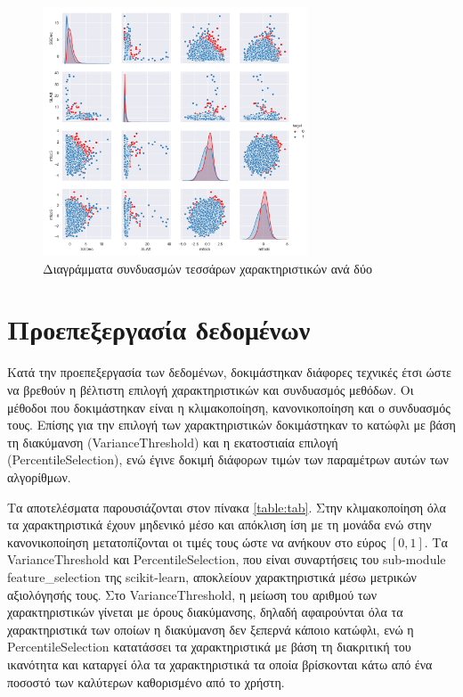 \begin{figure}[h]
\centering
\includegraphics[width=0.7\textwidth]{res/figure_1.png}
\caption{Διαγράμματα συνδυασμών τεσσάρων χαρακτηριστικών ανά δύο}
\label{featureTable:table1}
\end{figure}


\section{Προεπεξεργασία δεδομένων}

Κατά την προεπεξεργασία των δεδομένων, δοκιμάστηκαν διάφορες τεχνικές έτσι ώστε να βρεθούν η βέλτιστη επιλογή χαρακτηριστικών και συνδυασμός μεθόδων. Οι μέθοδοι που δοκιμάστηκαν είναι η κλιμακοποίηση, κανονικοποίηση και ο συνδυασμός τους. Επίσης για την επιλογή των χαρακτηριστικών δοκιμάστηκαν το κατώφλι με βάση τη διακύμανση (VarianceThreshold) και η εκατοστιαία επιλογή (PercentileSelection), ενώ έγινε δοκιμή διάφορων τιμών των παραμέτρων αυτών των αλγορίθμων.

Τα αποτελέσματα παρουσιάζονται στον πίνακα \ref{table:tab}. Στην κλιμακοποίηση όλα τα χαρακτηριστικά έχουν μηδενικό μέσο και απόκλιση ίση με τη μονάδα ενώ στην κανονικοποίηση μετατοπίζονται οι τιμές τους ώστε να ανήκουν στο εύρος $[0,1]$. Τα VarianceThreshold και PercentileSelection, που είναι συναρτήσεις του sub-module feature\_selection της scikit-learn, αποκλείουν χαρακτηριστικά μέσω μετρικών αξιολόγησής τους. Στο VarianceThreshold, η μείωση του αριθμού των χαρακτηριστικών γίνεται με όρους διακύμανσης, δηλαδή αφαιρούνται όλα τα χαρακτηριστικά των οποίων η διακύμανση δεν ξεπερνά κάποιο κατώφλι, ενώ η PercentileSelection κατατάσσει τα χαρακτηριστικά με βάση τη διακριτική του ικανότητα και καταργεί όλα τα χαρακτηριστικά τα οποία βρίσκονται κάτω από ένα ποσοστό των καλύτερων καθορισμένο από το χρήστη.

